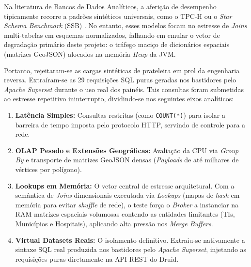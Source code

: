 Na literatura de Bancos de Dados Analíticos, a aferição de desempenho tipicamente recorre a padrões sintéticos universais, como o TPC-H ou o \textit{Star Schema Benchmark} (SSB) \cite{oneil_ssb_2009}. No entanto, esses modelos focam no estresse de \textit{Joins} multi-tabelas em esquemas normalizados, falhando em emular o vetor de degradação primário deste projeto: o tráfego maciço de dicionários espaciais (matrizes GeoJSON) alocados na memória \textit{Heap} da JVM. 

Portanto, rejeitaram-se as cargas sintéticas de prateleira em prol da engenharia reversa. Extraíram-se as 29 requisições SQL puras geradas nos bastidores pelo \textit{Apache Superset} durante o uso real dos painéis. Tais consultas foram submetidas ao estresse repetitivo ininterrupto, dividindo-se nos seguintes eixos analíticos:

\begin{enumerate}
    \item \textbf{Latência Simples:} Consultas restritas (como \texttt{COUNT(*)}) para isolar a barreira de tempo imposta pelo protocolo HTTP, servindo de controle para a rede.
    \item \textbf{OLAP Pesado e Extensões Geográficas:} Avaliação da CPU via \textit{Group By} e transporte de matrizes GeoJSON densas (\textit{Payloads} de até milhares de vértices por polígono).
    \item \textbf{Lookups em Memória:} O vetor central de estresse arquitetural. Com a semântica de \textit{Joins} dimensionais executada via \textit{Lookups} (mapas de \textit{hash} em memória para evitar \textit{shuffle} de rede), o teste força o \textit{Broker} a instanciar na RAM matrizes espaciais volumosas contendo as entidades limitantes (TIs, Municípios e Hospitais), aplicando alta pressão nos \textit{Merge Buffers}.
    \item \textbf{Virtual Datasets Reais:} O isolamento definitivo. Extraiu-se nativamente a sintaxe SQL real produzida nos bastidores pelo \textit{Apache Superset}, injetando as requisições puras diretamente na API REST do Druid.
\end{enumerate}
